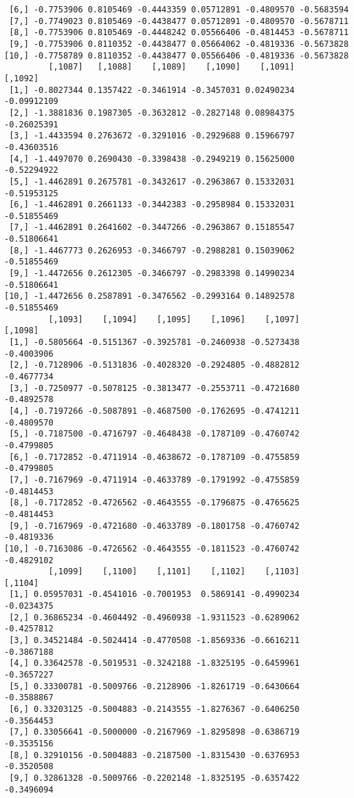 \documentclass[
  letterpaper,
  DIV=11,
  numbers=noendperiod]{scrreprt}
\begin{document}
\begin{verbatim}
 [6,] -0.7753906 0.8105469 -0.4443359 0.05712891 -0.4809570 -0.5683594
 [7,] -0.7749023 0.8105469 -0.4438477 0.05712891 -0.4809570 -0.5678711
 [8,] -0.7753906 0.8105469 -0.4448242 0.05566406 -0.4814453 -0.5678711
 [9,] -0.7753906 0.8110352 -0.4438477 0.05664062 -0.4819336 -0.5673828
[10,] -0.7758789 0.8110352 -0.4438477 0.05566406 -0.4819336 -0.5673828
         [,1087]   [,1088]    [,1089]    [,1090]    [,1091]     [,1092]
 [1,] -0.8027344 0.1357422 -0.3461914 -0.3457031 0.02490234 -0.09912109
 [2,] -1.3881836 0.1987305 -0.3632812 -0.2827148 0.08984375 -0.26025391
 [3,] -1.4433594 0.2763672 -0.3291016 -0.2929688 0.15966797 -0.43603516
 [4,] -1.4497070 0.2690430 -0.3398438 -0.2949219 0.15625000 -0.52294922
 [5,] -1.4462891 0.2675781 -0.3432617 -0.2963867 0.15332031 -0.51953125
 [6,] -1.4462891 0.2661133 -0.3442383 -0.2958984 0.15332031 -0.51855469
 [7,] -1.4462891 0.2641602 -0.3447266 -0.2963867 0.15185547 -0.51806641
 [8,] -1.4467773 0.2626953 -0.3466797 -0.2988281 0.15039062 -0.51855469
 [9,] -1.4472656 0.2612305 -0.3466797 -0.2983398 0.14990234 -0.51806641
[10,] -1.4472656 0.2587891 -0.3476562 -0.2993164 0.14892578 -0.51855469
         [,1093]    [,1094]    [,1095]    [,1096]    [,1097]    [,1098]
 [1,] -0.5805664 -0.5151367 -0.3925781 -0.2460938 -0.5273438 -0.4003906
 [2,] -0.7128906 -0.5131836 -0.4028320 -0.2924805 -0.4882812 -0.4677734
 [3,] -0.7250977 -0.5078125 -0.3813477 -0.2553711 -0.4721680 -0.4892578
 [4,] -0.7197266 -0.5087891 -0.4687500 -0.1762695 -0.4741211 -0.4809570
 [5,] -0.7187500 -0.4716797 -0.4648438 -0.1787109 -0.4760742 -0.4799805
 [6,] -0.7172852 -0.4711914 -0.4638672 -0.1787109 -0.4755859 -0.4799805
 [7,] -0.7167969 -0.4711914 -0.4633789 -0.1791992 -0.4755859 -0.4814453
 [8,] -0.7172852 -0.4726562 -0.4643555 -0.1796875 -0.4765625 -0.4814453
 [9,] -0.7167969 -0.4721680 -0.4633789 -0.1801758 -0.4760742 -0.4819336
[10,] -0.7163086 -0.4726562 -0.4643555 -0.1811523 -0.4760742 -0.4829102
         [,1099]    [,1100]    [,1101]    [,1102]    [,1103]    [,1104]
 [1,] 0.05957031 -0.4541016 -0.7001953  0.5869141 -0.4990234 -0.0234375
 [2,] 0.36865234 -0.4604492 -0.4960938 -1.9311523 -0.6289062 -0.4257812
 [3,] 0.34521484 -0.5024414 -0.4770508 -1.8569336 -0.6616211 -0.3867188
 [4,] 0.33642578 -0.5019531 -0.3242188 -1.8325195 -0.6459961 -0.3657227
 [5,] 0.33300781 -0.5009766 -0.2128906 -1.8261719 -0.6430664 -0.3588867
 [6,] 0.33203125 -0.5004883 -0.2143555 -1.8276367 -0.6406250 -0.3564453
 [7,] 0.33056641 -0.5000000 -0.2167969 -1.8295898 -0.6386719 -0.3535156
 [8,] 0.32910156 -0.5004883 -0.2187500 -1.8315430 -0.6376953 -0.3520508
 [9,] 0.32861328 -0.5009766 -0.2202148 -1.8325195 -0.6357422 -0.3496094

\end{verbatim}
\end{document}
